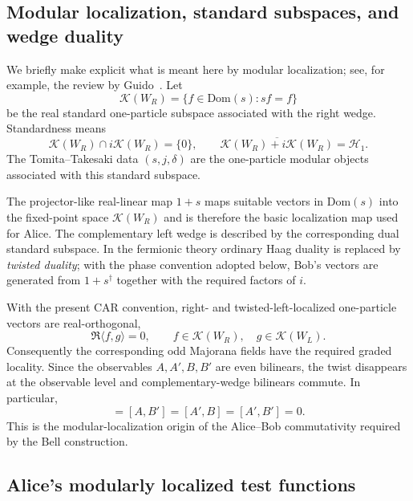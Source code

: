 \documentclass[11pt]{article}
\begin{document}
\subsection{Modular localization, standard subspaces, and wedge duality}

We briefly make explicit what is meant here by modular localization; see, for example, the review by Guido~\cite{Guido2011}. Let
\begin{equation}
 \mathcal K(W_R)=\{f\in\mathrm{Dom}(s):sf=f\}
\end{equation}
be the real standard one-particle subspace associated with the right wedge. Standardness means
\begin{equation}
 \mathcal K(W_R)\cap i\mathcal K(W_R)=\{0\},
 \qquad
 \overline{\mathcal K(W_R)+i\mathcal K(W_R)}=\mathcal H_1.
\end{equation}
The Tomita--Takesaki data $(s,j,\delta)$ are the one-particle modular objects associated with this standard subspace.

The projector-like real-linear map $1+s$ maps suitable vectors in $\mathrm{Dom}(s)$ into the fixed-point space $\mathcal K(W_R)$ and is therefore the basic localization map used for Alice. The complementary left wedge is described by the corresponding dual standard subspace. In the fermionic theory ordinary Haag duality is replaced by \emph{twisted duality}; with the phase convention adopted below, Bob's vectors are generated from $1+s^\dagger$ together with the required factors of $i$.

With the present CAR convention, right- and twisted-left-localized one-particle vectors are real-orthogonal,
\begin{equation}
 \Re\langle f,g\rangle=0,
 \qquad
 f\in\mathcal K(W_R),\quad
 g\in\mathcal K(W_L).
 \label{eq:wedge-real-orth}
\end{equation}
Consequently the corresponding odd Majorana fields have the required graded locality. Since the observables $A,A',B,B'$ are even bilinears, the twist disappears at the observable level and complementary-wedge bilinears commute. In particular,
\begin{equation}
 [A,B]=[A,B']=[A',B]=[A',B']=0.
 \label{eq:crosscommute-modular}
\end{equation}
This is the modular-localization origin of the Alice--Bob commutativity required by the Bell construction.

\subsection{Alice's modularly localized test functions}
\end{document}
